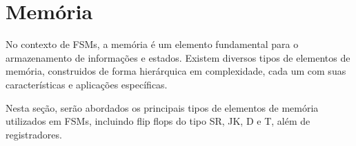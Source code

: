 \section{Memória}

No contexto de FSMs, a memória é um elemento fundamental para o armazenamento de informações e estados. Existem diversos tipos de elementos de memória, construidos de forma hierárquica em complexidade, cada um com suas características e aplicações específicas. 

Nesta seção, serão abordados os principais tipos de elementos de memória utilizados em FSMs, incluindo flip flops do tipo SR, JK, D e T, além de registradores.




\label{sec:dff}


